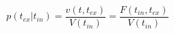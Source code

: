 \begin{equation}
p(t_{ex}|t_{in})  = \frac{v(t,t_{ex})}{V(t_{in})}= \frac{F(t_{in},t_{ex})}{V(t_{in})}
\end{equation}